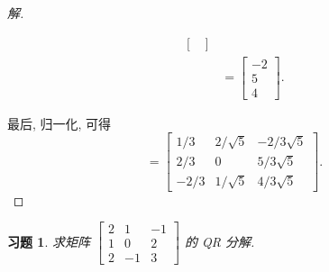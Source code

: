 \documentclass[UTF8]{ctexart}
\newtheorem{ex}[thm]{习题}
\begin{document}
\begin{proof}[解]
\begin{enumerate}
\begin{align*}
\begin{bmatrix}
  \end{bmatrix} \\
  &=
  \begin{bmatrix}
    -2 \\ 5 \\ 4
  \end{bmatrix}.
\end{align*}
\end{enumerate}
最后, 归一化, 可得
\begin{equation*}
  [\boldsymbol{q}_1,\boldsymbol{q}_2,\boldsymbol{q}_3] =
  \begin{bmatrix}
    1/3 & 2/\sqrt{5} & -2/3\sqrt{5} \\
    2/3 & 0 & 5/3\sqrt{5}\\
    -2/3 & 1/\sqrt{5} & 4/3\sqrt{5}
  \end{bmatrix}.
\end{equation*}
\end{proof}

\begin{ex}
  求矩阵 \(\begin{bmatrix} 2 & 1 & -1 \\ 1 & 0 & 2 \\ 2 & -1 & 3 \end{bmatrix}\) 的 QR 分解.
\end{ex}
\end{document}
